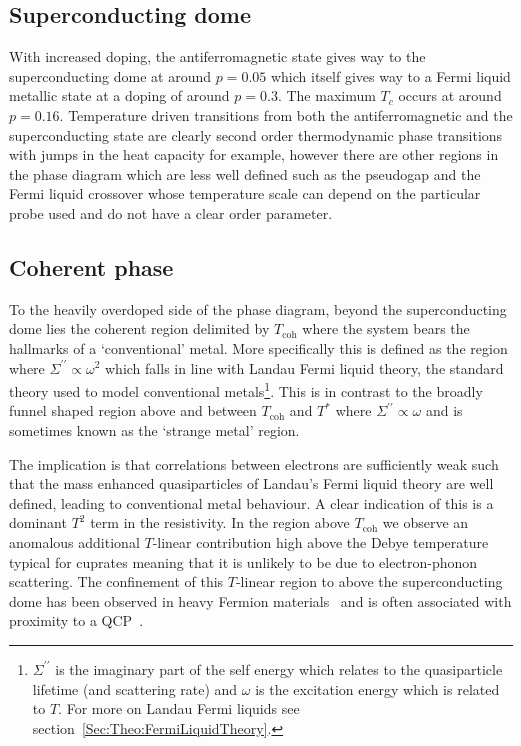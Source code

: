 \subsection{Superconducting dome}

With increased doping, the antiferromagnetic state gives way to the superconducting dome at around $p=0.05$ which itself gives way to a Fermi liquid metallic state at a doping of around $p=0.3$. The maximum $T_c$ occurs at around $p=0.16$. Temperature driven transitions from both the antiferromagnetic and the superconducting state are clearly second order thermodynamic phase transitions with jumps in the heat capacity for example, however there are other regions in the phase diagram which are less well defined such as the pseudogap and the Fermi liquid crossover whose temperature scale can depend on the particular probe used and do not have a clear order parameter.

\subsection{Coherent phase}

To the heavily overdoped side of the phase diagram, beyond the superconducting dome lies the coherent region delimited by $T_{\textrm{coh}}$ where the system bears the hallmarks of a `conventional' metal. More specifically this is defined as the region where $\Sigma^{\prime\prime} \propto \omega^2$ which falls in line with Landau Fermi liquid theory, the standard theory used to model conventional metals\footnote{$\Sigma^{\prime\prime}$ is the imaginary part of the self energy which relates to the quasiparticle lifetime (and scattering rate) and $\omega$ is the excitation energy which is related to $T$. For more on Landau Fermi liquids see section~\ref{Sec:Theo:FermiLiquidTheory}.}. This is in contrast to the broadly funnel shaped region above and between $T_{\textrm{coh}}$ and $T^*$ where $\Sigma^{\prime\prime} \propto \omega$ and is sometimes known as the `strange metal' region.

 The implication is that correlations between electrons are sufficiently weak such that the mass enhanced quasiparticles of Landau's Fermi liquid theory are well defined, leading to conventional metal behaviour. A clear indication of this is a dominant $T^2$ term in the resistivity. In the region above $T_{\textrm{coh}}$ we observe an anomalous additional $T$-linear contribution high above the Debye temperature typical for cuprates meaning that it is unlikely to be due to electron-phonon scattering. The confinement of this $T$-linear region to above the superconducting dome has been observed in heavy Fermion materials~\cite{Custers2003} and is often associated with proximity to a \ac{QCP}~\cite{Hussey2008}.

